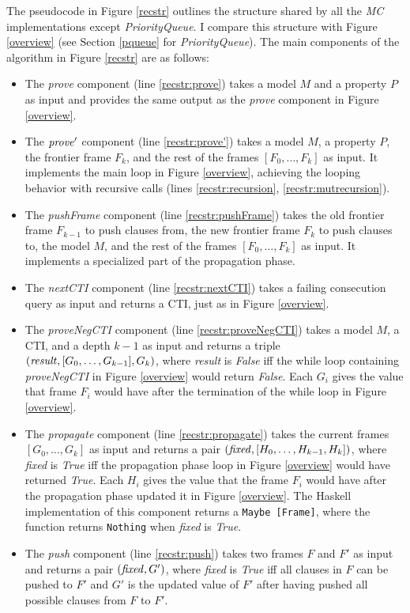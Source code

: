 \documentclass[12pt,a4paper,twoside,openright]{report}
\begin{document}
{{The pseudocode in Figure \ref{recstr}
outlines the structure shared by all the \emph{MC}
implementations except {\it PriorityQueue}.
I compare this structure with Figure \ref{overview} (see Section
\ref{pqueue} for \emph{PriorityQueue}).
The main components of the algorithm in Figure \ref{recstr} are as follows:
\begin{itemize}
\item The {\it prove} component (line \ref{recstr:prove})
takes a model $M$ and a property $P$ as input
 and provides the same output as the \emph{prove} component in Figure \ref{overview}.
\item The ${\it prove'}$ component (line \ref{recstr:prove'})
takes a model $M$, a property $P$,
the frontier frame $F_k$, and the rest of the frames $[F_0,\ldots,F_k]$ as input. It
implements the main loop in Figure \ref{overview}, achieving the looping behavior with
recursive calls (lines \ref{recstr:recursion}, \ref{recstr:mutrecursion}).
\item The {\it pushFrame} component (line \ref{recstr:pushFrame}) takes the old frontier frame
$F_{k - 1}$ to push clauses from, the new frontier frame $F_k$ to push clauses to,
the model $M$, and the rest of the frames $[F_0, \ldots, F_k]$ as input.
It implements a specialized part of the propagation phase.
\item The {\it nextCTI} component (line \ref{recstr:nextCTI})
takes a failing consecution query as input and returns
a CTI, just as in Figure \ref{overview}.
\item The {\it proveNegCTI} component (line \ref{recstr:proveNegCTI})
takes a model $M$, a CTI, and a depth $k - 1$ as input and
returns a triple $({\it result}, [G_0, \ldots, G_{k - 1}], G_k)$, where {\it result}
is {\it False} iff the while loop containing {\it proveNegCTI} in Figure \ref{overview}
would return {\it False}.
Each $G_i$ gives the value that frame $F_i$ would have after the termination of
the while loop in Figure \ref{overview}.
\item The {\it propagate} component (line \ref{recstr:propagate})
takes the current frames $[G_0, \ldots, G_k]$ as input and
returns a pair $({\it fixed}, [H_0, \ldots, H_{k-1}, H_k])$, where {\it fixed} is {\it True}
iff the propagation phase loop in Figure \ref{overview} would have returned {\it True}.
Each $H_i$ gives the value that the frame $F_i$ would have after the propagation
phase updated it in Figure \ref{overview}. The Haskell implementation of this component
returns a \verb,Maybe [Frame],, where the function returns \verb,Nothing,
when {\it fixed} is {\it True}.
\item The {\it push} component (line \ref{recstr:push})
takes two frames $F$ and $F'$ as input and returns a
pair $({\it fixed}, G')$, where {\it fixed} is {\it True} iff all clauses in $F$ can
be pushed to $F'$ and $G'$ is the updated value of $F'$ after having pushed all possible
clauses from $F$ to $F'$.
\end{itemize}

}}
\end{document}
